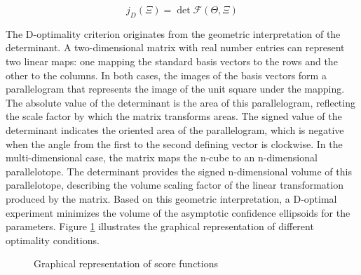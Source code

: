 \documentclass[../Article_Design_of_Experiment.tex]{subfiles}
\begin{document}
	{\footnotesize
	\begin{equation}
		j_D(\Xi) = \det \mathcal{F}(\Theta, \Xi)
	\end{equation} }

	The D-optimality criterion originates from the geometric interpretation of the determinant. A two-dimensional matrix with real number entries can represent two linear maps: one mapping the standard basis vectors to the rows and the other to the columns. In both cases, the images of the basis vectors form a parallelogram that represents the image of the unit square under the mapping. The absolute value of the determinant is the area of this parallelogram, reflecting the scale factor by which the matrix transforms areas. The signed value of the determinant indicates the oriented area of the parallelogram, which is negative when the angle from the first to the second defining vector is clockwise. In the multi-dimensional case, the matrix maps the n-cube to an n-dimensional parallelotope. The determinant provides the signed n-dimensional volume of this parallelotope, describing the volume scaling factor of the linear transformation produced by the matrix. Based on this geometric interpretation, a D-optimal experiment minimizes the volume of the asymptotic confidence ellipsoids for the parameters. Figure \ref{fig:score_fun} illustrates the graphical representation of different optimality conditions.
	
	\begin{figure}[!h]
		\centering
		\caption{Graphical representation of score functions}
		\label{fig:score_fun}
	\end{figure}
	
\end{document}
